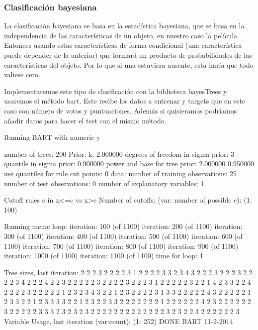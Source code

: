 \documentclass[a4paper]{article}
\begin{document}
\subsubsection{Clasificación bayesiana}
La clasificación bayesiana se basa en la estadística bayesiana, que se basa en la independencia de las características de un objeto, en nuestro caso la película. Entonces usando estas características de forma condicional (una característica puede depender de la anterior) que formará un producto de probabilidades de las características del objeto. Por lo que si una estuviera ausente, esta haría que todo valiese cero.

Implementaremos este tipo de clasificación con la biblioteca bayesTrees y usaremos el método bart. Este recibe los datos a entrenar y targets que en este caso son número de votos y puntuaciones. Además si quisieramos podríamos añadir datos para hacer el test con el mismo método.
\begin{Schunk}
\begin{Soutput}
Running BART with numeric y

number of trees: 200
Prior:
	k: 2.000000
	degrees of freedom in sigma prior: 3
	quantile in sigma prior: 0.900000
	power and base for tree prior: 2.000000 0.950000
	use quantiles for rule cut points: 0
data:
	number of training observations: 25
	number of test observations: 0
	number of explanatory variables: 1


Cutoff rules c in x<=c vs x>c
Number of cutoffs: (var: number of possible c):
(1: 100) 


Running mcmc loop:
iteration: 100 (of 1100)
iteration: 200 (of 1100)
iteration: 300 (of 1100)
iteration: 400 (of 1100)
iteration: 500 (of 1100)
iteration: 600 (of 1100)
iteration: 700 (of 1100)
iteration: 800 (of 1100)
iteration: 900 (of 1100)
iteration: 1000 (of 1100)
iteration: 1100 (of 1100)
time for loop: 1

Tree sizes, last iteration:
2 2 2 3 2 2 2 2 3 1 2 2 2 2 3 3 2 3 4 3 
2 2 2 3 2 2 2 3 2 2 2 2 3 4 2 2 2 4 2 2 
3 2 2 2 2 2 3 2 2 2 2 3 2 2 2 3 1 2 2 2 
2 2 3 2 2 1 4 2 3 3 2 2 4 2 2 2 2 3 2 2 
2 2 2 1 2 3 2 3 4 3 2 2 1 2 3 2 2 2 2 3 
1 3 3 2 2 2 2 2 4 3 2 2 2 2 2 1 2 3 3 2 
2 1 2 3 3 3 3 2 2 1 2 3 2 2 3 3 2 2 2 2 
2 2 2 1 2 2 2 2 2 2 4 2 3 2 2 2 2 2 2 3 
2 2 2 2 2 3 3 3 2 3 2 3 2 3 2 2 2 2 2 2 
2 2 2 2 2 2 2 3 2 3 2 2 3 2 2 2 2 2 2 3 
Variable Usage, last iteration (var:count):
(1: 252) 
DONE BART 11-2-2014
\end{Soutput}
\end{Schunk}
\end{document}

